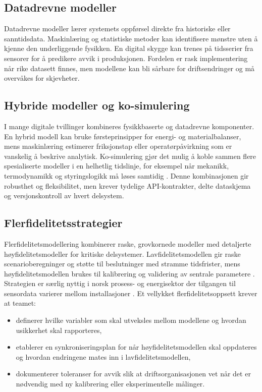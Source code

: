 \subsection{Datadrevne modeller}
Datadrevne modeller lærer systemets oppførsel direkte fra historiske eller sanntidsdata. Maskinlæring og statistiske metoder
kan identifisere mønstre uten å kjenne den underliggende fysikken. En digital skygge kan trenes på tidsserier fra sensorer for
å predikere avvik i produksjonen. Fordelen er rask implementering når rike datasett finnes, men modellene kan bli sårbare for
driftsendringer og må overvåkes for skjevheter.

\subsection{Hybride modeller og ko-simulering}
I mange digitale tvillinger kombineres fysikkbaserte og datadrevne komponenter. En hybrid modell kan bruke førsteprinsipper for
energi- og materialbalanser, mens maskinlæring estimerer friksjonstap eller operatørpåvirkning som er vanskelig å beskrive
analytisk. Ko-simulering gjør det mulig å koble sammen flere spesialiserte modeller i en helhetlig tidslinje, for eksempel når
mekanikk, termodynamikk og styringslogikk må løses samtidig \citep{boschert2018digital}. Denne kombinasjonen gir robusthet og
fleksibilitet, men krever tydelige API-kontrakter, delte dataskjema og versjonskontroll av hvert delsystem.

\subsection{Flerfidelitetsstrategier}
Flerfidelitetsmodellering kombinerer raske, grovkornede modeller med detaljerte høyfidelitetsmodeller for kritiske delsystemer.
Lavfidelitetsmodellen gir raske scenarioberegninger og støtte til beslutninger med stramme tidsfrister, mens høyfidelitetsmodellen
brukes til kalibrering og validering av sentrale parametere \citep{kennedy2000predicting}. Strategien er særlig nyttig i norsk
prosess- og energisektor der tilgangen til sensordata varierer mellom installasjoner \citep{sintef2021digital}. Et vellykket
flerfidelitetsoppsett krever at teamet:
\begin{itemize}
    \item definerer hvilke variabler som skal utveksles mellom modellene og hvordan usikkerhet skal rapporteres,
    \item etablerer en synkroniseringsplan for når høyfidelitetsmodellen skal oppdateres og hvordan endringene mates inn i
    lavfidelitetsmodellen,
    \item dokumenterer toleranser for avvik slik at driftsorganisasjonen vet når det er nødvendig med ny kalibrering eller
    eksperimentelle målinger.
\end{itemize}

